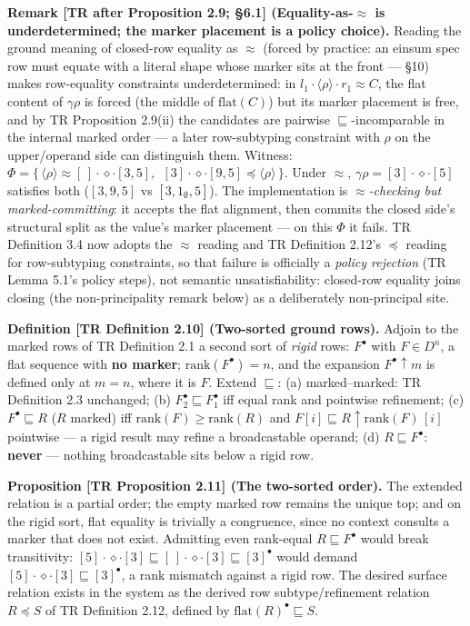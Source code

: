 \documentclass[
  10pt,
  letterpaper,
]{article}
\begin{document}
\textbf{Remark {[}TR after Proposition 2.9; §6.1{]}
(Equality-as-\(\approx\) is underdetermined; the marker placement is a
policy choice).} Reading the ground meaning of closed-row equality as
\(\approx\) (forced by practice: an einsum spec row must equate with a
literal shape whose marker sits at the front --- §10) makes row-equality
constraints underdetermined: in
\(l_1\cdot\langle\rho\rangle\cdot r_1 \approx C\), the flat content of
\(\gamma\rho\) is forced (the middle of \(\mathrm{flat}(C)\)) but its
marker placement is free, and by TR Proposition 2.9(ii) the candidates
are pairwise \(\sqsubseteq\)-incomparable in the internal marked order
--- a later row-subtyping constraint with \(\rho\) on the upper/operand
side can distinguish them. Witness:
\(\Phi = \{\,\langle\rho\rangle \approx [\,]\cdot\diamond\cdot[3,5],\ \ [3]\cdot\diamond\cdot[9,5] \preceq \langle\rho\rangle\,\}\).
Under \(\approx\), \(\gamma\rho = [3]\cdot\diamond\cdot[5]\) satisfies
both (\([3,9,5]\) vs \([3,1_\emptyset,5]\)). The implementation is
\emph{\(\approx\)-checking but marked-committing}: it accepts the flat
alignment, then commits the closed side's structural split as the
value's marker placement --- on this \(\Phi\) it fails. TR Definition
3.4 now adopts the \(\approx\) reading and TR Definition 2.12's
\(\preceq\) reading for row-subtyping constraints, so that failure is
officially a \emph{policy rejection} (TR Lemma 5.1's policy steps), not
semantic unsatisfiability: closed-row equality joins closing (the
non-principality remark below) as a deliberately non-principal site.

\textbf{Definition {[}TR Definition 2.10{]} (Two-sorted ground rows).}
Adjoin to the marked rows of TR Definition 2.1 a second sort of
\emph{rigid} rows: \(F^\bullet\) with \(F \in D^n\), a flat sequence
with \textbf{no marker}; \(\mathrm{rank}(F^\bullet) = n\), and the
expansion \(F^\bullet{\uparrow}m\) is defined only at \(m = n\), where
it is \(F\). Extend \(\sqsubseteq\): (a) marked--marked: TR Definition
2.3 unchanged; (b) \(F_2^\bullet \sqsubseteq F_1^\bullet\) iff equal
rank and pointwise refinement; (c) \(F^\bullet \sqsubseteq R\) (\(R\)
marked) iff \(\mathrm{rank}(F) \ge \mathrm{rank}(R)\) and
\(F[i] \sqsubseteq R{\uparrow}\mathrm{rank}(F)\,[i]\) pointwise --- a
rigid result may refine a broadcastable operand; (d)
\(R \sqsubseteq F^\bullet\): \textbf{never} --- nothing broadcastable
sits below a rigid row.

\textbf{Proposition {[}TR Proposition 2.11{]} (The two-sorted order).}
The extended relation is a partial order; the empty marked row remains
the unique top; and on the rigid sort, flat equality is trivially a
congruence, since no context consults a marker that does not exist.
Admitting even rank-equal \(R \sqsubseteq F^\bullet\) would break
transitivity:
\([5]\cdot\diamond\cdot[3] \sqsubseteq [\,]\cdot\diamond\cdot[3] \sqsubseteq [3]^\bullet\)
would demand \([5]\cdot\diamond\cdot[3] \sqsubseteq [3]^\bullet\), a
rank mismatch against a rigid row. The desired surface relation exists
in the system as the derived row subtype/refinement relation
\(R \preceq S\) of TR Definition 2.12, defined by
\(\mathrm{flat}(R)^\bullet \sqsubseteq S\).
\end{document}
